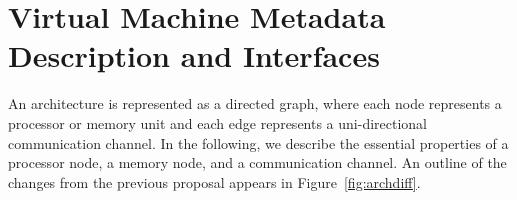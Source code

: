 \newcommand{\taba}[1]{\parbox{2.4in}{ ~ \vspace{-0pt} \\ #1 \vspace{-6pt} \\ }}
\newcommand{\tabb}[1]{\parbox{3.6in}{ ~ \vspace{-0pt} \\ #1 \vspace{-6pt} \\ }}
\newcommand{\mytable}[2]{
  {\small
    \begin{tabular}{|l|l|} \hline
      Attribute Name & #1 \\
      \hline \hline
      #2
    \end{tabular}
  }
}
\newcommand{\enttable}[1]{\mytable{Type - Units / Interpretation}{#1}}
\newcommand{\sumtable}[1]{\mytable{Summary}{#1}}
\newcommand{\justtable}[1]{\mytable{Summary and Justification}{#1}}
\newcommand{\entry}[3]{\taba{#1} & \tabb{#2 \\ #3} \\ \hline}
\newcommand{\summary}[2]{\taba{#1} & \tabb{#2} \\ \hline}
\newcommand{\just}[3]{\taba{#1} & \tabb{#2 \\ {\it #3}} \\ \hline}

\section{Virtual Machine Metadata Description and Interfaces}

An architecture is represented as a directed graph, where each node
represents a processor or memory unit and each edge represents a
uni-directional communication channel.  In the following, we describe
the essential properties of a processor node, a memory node, and a
communication channel.  An outline of the changes from the previous
proposal appears in Figure~\ref{fig:archdiff}.

\begin{figure}[t]
\begin{center}
\end{center}
\end{figure}

